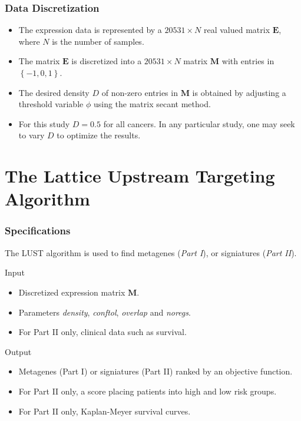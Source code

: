 \documentclass[
	11pt, %
]{beamer}
\begin{document}
\begin{frame}
	\frametitle{Data Discretization}
	
	\begin{itemize}
        \item The expression data is represented by a $20531 \times N$ real valued matrix $\mathbf{E}$, where $N$ is the number of samples.
        \pause
        \item The matrix $\mathbf{E}$ is discretized into a $20531 \times N$ matrix $\mathbf{M}$ with entries in $\left\{ -1, 0, 1\right\}$.
        \pause
        \item The desired density $D$ of non-zero entries in $\mathbf{M}$ is obtained by adjusting a threshold variable $\phi$ using the matrix secant method.
        \pause
        \item For this study $D = 0.5$ for all cancers. In any particular study, one may seek to vary $D$ to optimize the results.
    \end{itemize}
\end{frame}


\section{The Lattice Upstream Targeting Algorithm}

\begin{frame}
	\frametitle{Specifications}
	\begin{block}{}
        The LUST algorithm is used to find metagenes (\emph{Part I}), or signiatures (\emph{Part II}).
    \end{block}
    \pause
    \begin{block}{Input}
        \begin{itemize}
            \item Discretized expression matrix $\mathbf{M}$.
            \item Parameters \emph{density}, \emph{conftol}, \emph{overlap} and \emph{noregs}.
            \item For Part II only, clinical data such as survival.
        \end{itemize}
    \end{block}
    \pause
    \begin{block}{Output}
        \begin{itemize}
            \item Metagenes (Part I) or signiatures (Part II) ranked by an objective function.
            \item For Part II only, a score placing patients into high and low risk groups.
            \item For Part II only, Kaplan-Meyer survival curves.
        \end{itemize}
    \end{block}
\end{frame}
\end{document}
